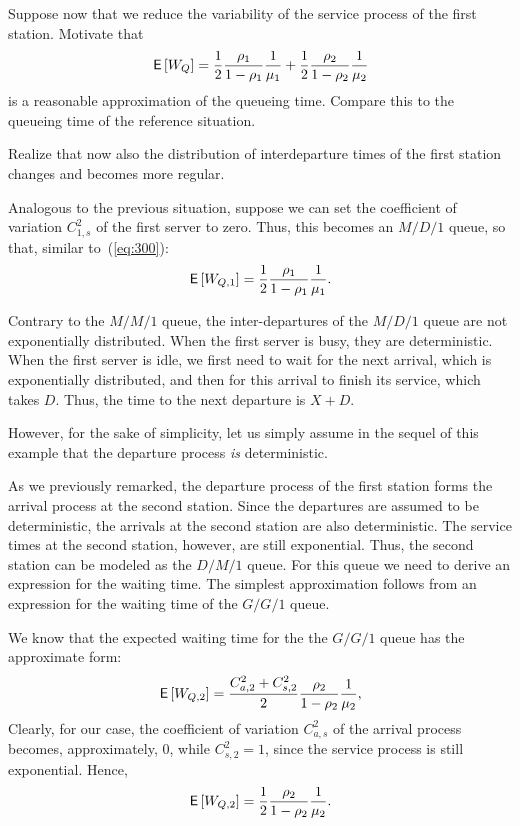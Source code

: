 \begin{exercise}
Suppose now that we reduce the variability of the service process of the first station.
Motivate that 
\begin{equation*}
  \,\mathsf{E}\left[W_Q\right]= \frac12\frac{\rho_1}{1-\rho_1} \frac1{\mu_1} +
  \frac12\frac{\rho_2}{1-\rho_2} \frac1{\mu_2}
\end{equation*}
is a reasonable approximation of the queueing time. Compare this to the queueing time of the reference situation.
  \begin{hint}
    Realize that now also the distribution of interdeparture times of the first station changes and becomes more regular.
  \end{hint}
  \begin{solution}
Analogous to the previous situation, suppose we can set the coefficient of variation
$C_{1,s}^2$ of the first server to zero. Thus, this becomes an $M/D/1$
queue, so that, similar to~(\ref{eq:300}):
\begin{equation*}
\,\mathsf{E}\left[W_{Q,1}\right] = \frac{1}2\frac{\rho_1}{1-\rho_1} \frac1{\mu_1}.
\end{equation*}

Contrary to the $M/M/1$ queue, the inter-departures of the $M/D/1$
queue are not exponentially distributed. When the first
server is busy, they are deterministic. When the first server is idle, we first
need to wait for the next arrival, which is exponentially distributed, and then for this arrival to finish its service, which
takes $D$. Thus, the time to the next departure is $X+D$.  

However, for the sake of simplicity, let us simply assume in the sequel of this
example that the departure process \emph{is} deterministic.

As we previously remarked, the departure process of the first station
forms the arrival process at the second station.  Since the departures
are assumed to be deterministic, the arrivals at the second station
are also deterministic.  The service times at the second station, however, are still
exponential.  Thus, the second station can be modeled as
the $D/M/1$ queue. For this queue we need to derive an expression for
the waiting time. The simplest approximation follows from an
expression for the waiting time of the $G/G/1$ queue.

We know that the expected waiting time for the the $G/G/1$ queue has
the approximate form:
\begin{equation}\label{eq:500}
\,\mathsf{E}\left[W_{Q,2}\right] = \frac{C_{a,2}^2+C_{s,2}^2}2\frac{\rho_2}{1-\rho_2} \frac1{\mu_2},
\end{equation}
Clearly, for our case, the coefficient of  variation $C_{a,s}^2$ of the
arrival process becomes, approximately, $0$, while $C_{s,2}^2 = 1$,
since the service process is still exponential. Hence,
\begin{equation}\label{eq:400}
\,\mathsf{E}\left[W_{Q,2}\right] = \frac12\frac{\rho_2}{1-\rho_2} \frac1{\mu_2}.
\end{equation}


\end{solution}
\end{exercise}
